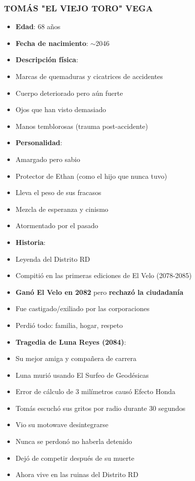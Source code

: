 \documentclass[11pt,a4paper]{report}
\begin{document}
\subsubsection{TOMÁS "EL VIEJO TORO" VEGA}
\begin{itemize}
  \item \textbf{Edad}: 68 años
  \item \textbf{Fecha de nacimiento}: $\sim$2046
  \item \textbf{Descripción física}: 
  \item Marcas de quemaduras y cicatrices de accidentes
  \item Cuerpo deteriorado pero aún fuerte
  \item Ojos que han visto demasiado
  \item Manos temblorosas (trauma post-accidente)
  \item \textbf{Personalidad}: 
  \item Amargado pero sabio
  \item Protector de Ethan (como el hijo que nunca tuvo)
  \item Lleva el peso de sus fracasos
  \item Mezcla de esperanza y cinismo
  \item Atormentado por el pasado
  \item \textbf{Historia}: 
  \item Leyenda del Distrito RD
  \item Compitió en las primeras ediciones de El Velo (2078-2085)
  \item \textbf{Ganó El Velo en 2082} pero \textbf{rechazó la ciudadanía}
  \item Fue castigado/exiliado por las corporaciones
  \item Perdió todo: familia, hogar, respeto
  \item \textbf{Tragedia de Luna Reyes (2084)}: 
  \item Su mejor amiga y compañera de carrera
  \item Luna murió usando El Surfeo de Geodésicas
  \item Error de cálculo de 3 milímetros causó Efecto Honda
  \item Tomás escuchó sus gritos por radio durante 30 segundos
  \item Vio su motowave desintegrarse
  \item Nunca se perdonó no haberla detenido
  \item Dejó de competir después de su muerte
  \item Ahora vive en las ruinas del Distrito RD

\end{itemize}
\end{document}
